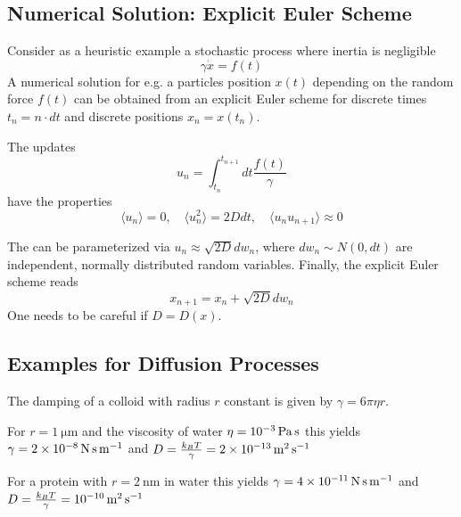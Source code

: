 \documentclass{notebook}
\begin{document}
\subsection*{Numerical Solution: Explicit Euler Scheme}

Consider as a heuristic example a stochastic process where inertia is negligible 
%
\begin{equation}
	\gamma \dot{x} = f(t)
\end{equation}
%
A numerical solution for e.g. a particles position $x(t)$ depending on the random force $f(t)$ can be obtained from an explicit Euler scheme for discrete times $t_n = n \cdot dt$ and discrete positions $x_n = x(t_n)$. 

The updates 
%
\begin{equation}
	u_n = \int_{t_n}^{t_{n+1}} dt \frac{f(t)}{\gamma}
\end{equation}
%
have the properties
%
\begin{equation}
	\langle u_n \rangle = 0, \quad 
	\langle u^2_n \rangle = 2 D dt, \quad 
	\langle u_n u_{n+1} \rangle \approx 0
\end{equation}
%

The can be parameterized via $u_n \approx \sqrt{2D} dw_n$, where $dw_n \sim N(0,dt)$ are independent, normally distributed random variables. Finally, the explicit Euler scheme reads
%
\begin{equation}
	x_{n+1} = x_n + \sqrt{2D} dw_n
\end{equation}
%
One needs to be careful if $D = D(x)$.


\subsection*{Examples for Diffusion Processes}


The damping of a colloid with radius $r$ constant is given by $\gamma = 6 \pi \eta r$.

For $r = \SI{1}{\micro\meter}$ and the viscosity of water $\eta = \SI{E-3}{\pascal\second}$
this yields $\gamma = \SI{2E-8}{\newton \second \per \meter}$ and $D = \frac{k_B T}{\gamma} = \SI{2E-13}{\meter\squared \per \second}$

For a protein with $r = \SI{2}{\nano\meter}$ in water this yields $\gamma = \SI{4E-11}{\newton \second \per \meter}$ and $D = \frac{k_B T}{\gamma} = \SI{E-10}{\meter\squared \per \second}$
\end{document}
